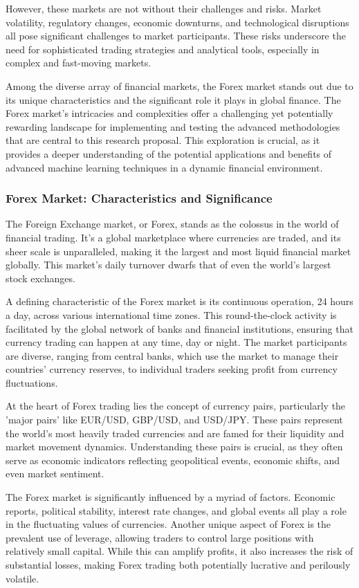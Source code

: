 However, these markets are not without their challenges and risks. Market volatility, regulatory changes, economic downturns, and technological disruptions all pose significant challenges to market participants. These risks underscore the need for sophisticated trading strategies and analytical tools, especially in complex and fast-moving markets.

Among the diverse array of financial markets, the Forex market stands out due to its unique characteristics and the significant role it plays in global finance. The Forex market’s intricacies and complexities offer a challenging yet potentially rewarding landscape for implementing and testing the advanced methodologies that are central to this research proposal. This exploration is crucial, as it provides a deeper understanding of the potential applications and benefits of advanced machine learning techniques in a dynamic financial environment.

\subsubsection{Forex Market: Characteristics and Significance}
The Foreign Exchange market, or Forex, stands as the colossus in the world of financial trading. It's a global marketplace where currencies are traded, and its sheer scale is unparalleled, making it the largest and most liquid financial market globally. This market's daily turnover dwarfs that of even the world’s largest stock exchanges.

A defining characteristic of the Forex market is its continuous operation, 24 hours a day, across various international time zones. This round-the-clock activity is facilitated by the global network of banks and financial institutions, ensuring that currency trading can happen at any time, day or night. The market participants are diverse, ranging from central banks, which use the market to manage their countries' currency reserves, to individual traders seeking profit from currency fluctuations.

At the heart of Forex trading lies the concept of currency pairs, particularly the 'major pairs' like EUR/USD, GBP/USD, and USD/JPY. These pairs represent the world's most heavily traded currencies and are famed for their liquidity and market movement dynamics. Understanding these pairs is crucial, as they often serve as economic indicators reflecting geopolitical events, economic shifts, and even market sentiment.

The Forex market is significantly influenced by a myriad of factors. Economic reports, political stability, interest rate changes, and global events all play a role in the fluctuating values of currencies. Another unique aspect of Forex is the prevalent use of leverage, allowing traders to control large positions with relatively small capital. While this can amplify profits, it also increases the risk of substantial losses, making Forex trading both potentially lucrative and perilously volatile.

